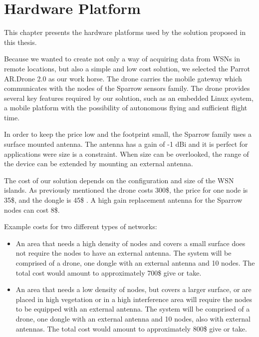 \normalfont\normalsize
\chapter{Hardware Platform}

This chapter presents the hardware platforms used by the solution proposed in this thesis. 

Because we wanted to create not only a way of acquiring data from WSNs in remote locations, but also a simple and low cost solution, we selected the Parrot AR.Drone 2.0 as our work horse. The drone carries the mobile gateway which communicates with the nodes of the Sparrow sensors family. The drone provides several key features required by our solution, such as an embedded Linux system, a mobile platform with the possibility of autonomous flying and sufficient flight time.

In order to keep the price low and the footprint small, the Sparrow family uses a surface mounted antenna. The antenna has a gain of -1 dBi and it is perfect for applications were size is a constraint. When size can be overlooked, the range of the device can be extended by mounting an external antenna.

The cost of our solution depends on the configuration and size of the WSN islands. As previously mentioned the drone costs 300\$, the price for one node is 35\$, and the dongle is 45\$ . A high gain replacement antenna for the Sparrow nodes can cost 8\$.

Example costs for two different types of networks:
\begin{itemize}

\item An area that needs a high density of nodes and covers a small surface does not require the nodes to have an external antenna. The system will be comprised of a drone, one dongle with an external antenna and 10 nodes. The total cost would amount to approximately 700\$ give or take.

\item  An area that needs a low density of nodes, but covers a larger surface, or are placed in high vegetation or in a high interference area will require the nodes to be equipped with an external antenna.  The system will be comprised of a drone, one dongle with an external antenna and 10 nodes, also with external antennas. The total cost would amount to approximately 800\$ give or take.

\end{itemize}

